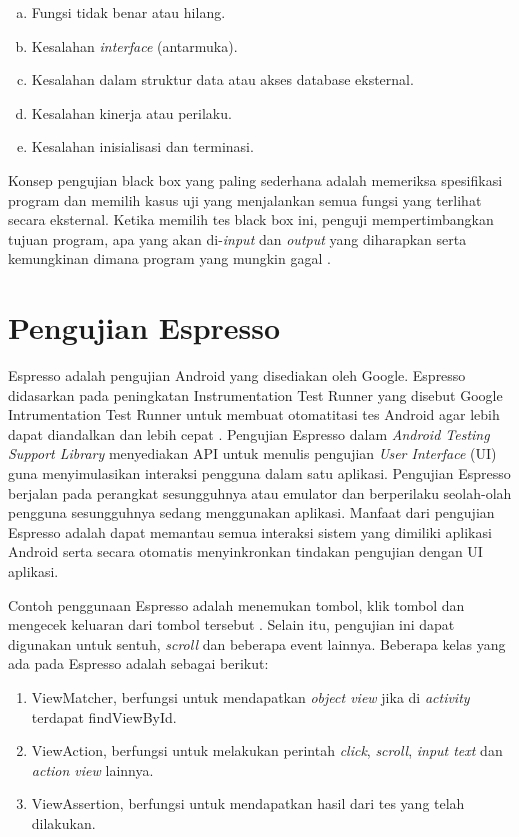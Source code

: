 \begin{enumerate}[a.]
	\item Fungsi tidak benar atau hilang.
	\item Kesalahan \textit{interface} (antarmuka).
	\item Kesalahan dalam struktur data atau akses database eksternal.
	\item Kesalahan kinerja atau perilaku.
	\item Kesalahan inisialisasi dan terminasi.
\end{enumerate}

Konsep pengujian black box yang paling sederhana adalah memeriksa spesifikasi program dan memilih kasus uji yang menjalankan semua fungsi yang terlihat secara eksternal. Ketika memilih tes black box ini, penguji mempertimbangkan tujuan program, apa yang akan di-\textit{input} dan \textit{output} yang diharapkan serta kemungkinan dimana program yang mungkin gagal \citep{thomas2002}. 


\section{Pengujian Espresso}
Espresso adalah pengujian Android yang disediakan oleh Google. Espresso didasarkan pada peningkatan Instrumentation Test Runner yang disebut Google Intrumentation Test Runner untuk membuat otomatitasi tes Android agar lebih dapat diandalkan dan lebih cepat \citep{knott2015}. Pengujian Espresso dalam \textit{Android Testing Support Library} menyediakan API untuk menulis pengujian \textit{User Interface} (UI) guna menyimulasikan interaksi pengguna dalam satu aplikasi. Pengujian Espresso berjalan pada perangkat sesungguhnya atau emulator dan berperilaku seolah-olah pengguna sesungguhnya sedang menggunakan aplikasi. Manfaat dari pengujian Espresso adalah dapat memantau semua interaksi sistem yang dimiliki aplikasi Android serta secara otomatis menyinkronkan tindakan pengujian dengan UI aplikasi. 

Contoh penggunaan Espresso adalah menemukan tombol, klik tombol dan mengecek keluaran dari tombol tersebut \cite{blundell2015}. Selain itu, pengujian ini dapat digunakan untuk sentuh, \textit{scroll} dan beberapa event lainnya. Beberapa kelas yang ada pada Espresso adalah sebagai berikut:
\begin{enumerate}
	\item ViewMatcher, berfungsi untuk mendapatkan \textit{object view} jika di \textit{activity} terdapat findViewById.
	\item ViewAction, berfungsi untuk melakukan perintah \textit{click}, \textit{scroll}, \textit{input text} dan \textit{action view} lainnya.
	\item ViewAssertion, berfungsi untuk mendapatkan hasil dari tes yang telah dilakukan.
\end{enumerate}

